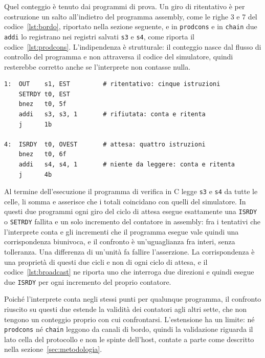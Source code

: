 Quel conteggio è tenuto dai programmi di prova. Un giro di ritentativo è per
costruzione un salto all'indietro del programma assembly, come le righe 3 e 7
del codice~\ref{lst:bordo}, riportato nella sezione seguente, e in
\texttt{prodcons} e in \texttt{chain} due \texttt{addi} lo registrano nei
registri salvati \texttt{s3} e \texttt{s4}, come riporta il
codice~\ref{lst:prodcons}. L'indipendenza è strutturale: il
conteggio nasce dal flusso di controllo del programma e non attraversa il
codice del simulatore, quindi resterebbe corretto anche se l'interprete non
contasse nulla.

\begin{lstlisting}[caption={I due cicli di \texttt{prodcons.s} che tengono il conto. I due \texttt{addi} appartengono al programma di prova e non al simulatore: incrementano due registri della cella a ogni giro di ritentativo e producono il conteggio indipendente che il programma di verifica confronta con i due contatori dell'interprete. È il confronto da cui discende la validità dei contatori anche negli altri sette programmi, che un conteggio proprio non lo hanno.},label={lst:prodcons},language=RISCV,float=htbp]
1:  OUT    s1, EST         # ritentativo: cinque istruzioni
    SETRDY t0, EST
    bnez   t0, 5f
    addi   s3, s3, 1       # rifiutata: conta e ritenta
    j      1b

4:  ISRDY  t0, OVEST       # attesa: quattro istruzioni
    bnez   t0, 6f
    addi   s4, s4, 1       # niente da leggere: conta e ritenta
    j      4b
\end{lstlisting}

Al termine dell'esecuzione il programma di verifica in C legge \texttt{s3} e
\texttt{s4} da tutte le celle, li somma e asserisce che i totali coincidano con
quelli del simulatore. In questi due programmi ogni giro del ciclo di attesa
esegue esattamente una \texttt{ISRDY} o \texttt{SETRDY} fallita e un solo
incremento del contatore in assembly: fra i tentativi che l'interprete conta e
gli incrementi che il programma esegue vale quindi una corrispondenza
biunivoca, e il confronto è un'uguaglianza fra interi, senza tolleranza. Una
differenza di un'unità fa fallire l'asserzione. La corrispondenza è una
proprietà di questi due cicli e non di ogni ciclo di attesa, e il
codice~\ref{lst:broadcast} ne riporta uno che interroga due direzioni e quindi
esegue due \texttt{ISRDY} per ogni incremento del proprio contatore.

Poiché l'interprete conta negli stessi punti per qualunque programma, il
confronto riuscito su questi due estende la validità dei contatori agli altri
sette, che non tengono un conteggio proprio con cui confrontarsi. L'estensione
ha un limite: né \texttt{prodcons} né \texttt{chain} leggono da canali di
bordo, quindi la validazione riguarda il lato cella del protocollo e
non le spinte dell'host, contate a parte come descritto nella
sezione~\ref{sec:metodologia}.

